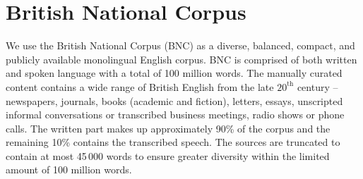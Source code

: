 {\renewcommand{\arraystretch}{1.2}
\begin{table}[t]
    \caption{Size of the train-development splits for the preprocessed BNC corpus. Note that the number of words is larger than the 100 million reported by the BNC Consortium due to our less conservative pre-tokenization strategy.}
    \label{tab:bnc}
\end{table}
}
 
    \section{British National Corpus}
    \label{sec:bnc}

    We use the British National Corpus (BNC) as a diverse, balanced, compact, and publicly available monolingual English corpus. %
    BNC is comprised of both written and spoken language with a total of 100 million words. 
    The manually curated content contains a wide range of British English from the late $20^\textrm{th}$ century -- newspapers, journals, books (academic and fiction), letters, essays, unscripted informal conversations or transcribed business meetings, radio shows or phone calls. %
    The written part makes up approximately 90\% of the corpus and the remaining 10\% contains the transcribed speech.
    The sources are truncated to contain at most 45\,000 words to ensure greater diversity within the limited amount of 100 million words.

